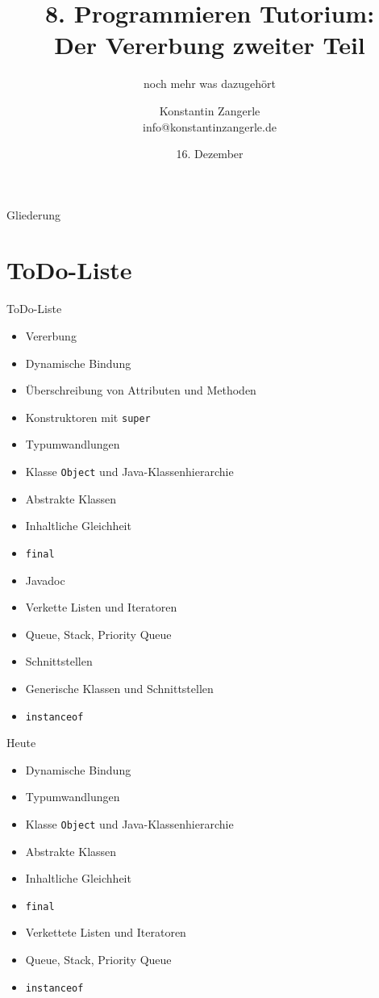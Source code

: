 \documentclass[18pt]{beamer}
\title[Programmieren Tutorium]{8. Programmieren Tutorium:\texorpdfstring{\\}{}Der Vererbung zweiter Teil}
\subtitle{noch mehr was dazugehört}
\author{Konstantin Zangerle \texorpdfstring{\\}{} info@konstantinzangerle.de}
\date{16. Dezember}
\institute{Chair for Software Design and Quality}
\begin{document}

\begin{frame}
\titlepage
\end{frame}

\begin{frame}{Gliederung}
\tableofcontents
\end{frame}
\section{ToDo-Liste}
\begin{frame}[fragile]{ToDo-Liste}
\begin{itemize}
 \item Vererbung \checkmark
 \item Dynamische Bindung
 \item Überschreibung von Attributen und Methoden \checkmark
 \item Konstruktoren mit \verb|super| \checkmark
 \item Typumwandlungen 
 \item Klasse \verb|Object| und Java-Klassenhierarchie
 \item Abstrakte Klassen
 \item Inhaltliche Gleichheit
 \item \verb|final|
 \item Javadoc \checkmark
 \item Verkette Listen und Iteratoren
 \item Queue, Stack, Priority Queue
 \item Schnittstellen \checkmark
 \item Generische Klassen und Schnittstellen \checkmark
  \item \verb|instanceof|
\end{itemize}
\end{frame}

\begin{frame}[fragile]{Heute}
\begin{itemize}
 \item Dynamische Bindung
 \item Typumwandlungen
 \item Klasse \verb|Object| und Java-Klassenhierarchie
 \item Abstrakte Klassen
 \item Inhaltliche Gleichheit
 \item \verb|final|
 \item Verkettete Listen und Iteratoren
 \item Queue, Stack, Priority Queue
 \item \verb|instanceof|
\end{itemize}
\end{frame}
\end{document}
